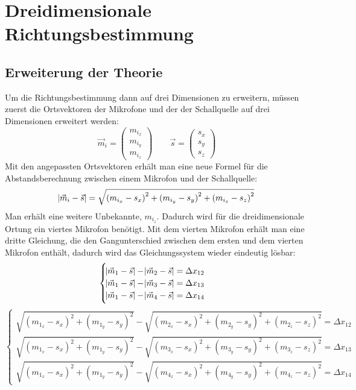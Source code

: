 \section{Dreidimensionale Richtungsbestimmung}
\subsection{Erweiterung der Theorie}
Um die Richtungsbestimmung dann auf drei Dimensionen zu erweitern, müssen zuerst die Ortsvektoren der Mikrofone und der der Schallquelle auf drei Dimensionen erweitert werden: $$\vec{m}_i = \begin{pmatrix}
m_{i_x} \\
m_{i_y} \\
m_{i_z}
\end{pmatrix} \quad\quad
\vec{s} = \begin{pmatrix}
{s_x} \\
{s_y} \\
{s_z}
\end{pmatrix}$$
Mit den angepassten Ortsvektoren erhält man eine neue Formel für die Abstandsberechnung zwischen einem Mikrofon und der Schallquelle:
$$\abs{\vec{m}_i - \vec{s}} = \sqrt{{(m_{i_x} - s_x)}^2 + {(m_{i_y} - s_y)}^2 + {(m_{i_z} - s_z)}^2}$$
Man erhält eine weitere Unbekannte, $m_{i_z}$. Dadurch wird für die dreidimensionale Ortung ein viertes Mikrofon benötigt. Mit dem vierten Mikrofon erhält man eine dritte Gleichung, die den Gangunterschied zwischen dem ersten und dem vierten Mikrofon enthält, dadurch wird das Gleichungssystem wieder eindeutig lösbar:
$$\begin{cases}
\abs{\vec{m}_1 - \vec{s}} - \abs{\vec{m}_2 - \vec{s}} = \Delta{x_{12}} \\
\abs{\vec{m}_1 - \vec{s}} - \abs{\vec{m}_3 - \vec{s}} = \Delta{x_{13}} \\
\abs{\vec{m}_1 - \vec{s}} - \abs{\vec{m}_4 - \vec{s}} = \Delta{x_{14}}
\end{cases}$$
$$\begin{cases}
\sqrt{{(m_{1_x} - s_x)}^2 + {(m_{1_y} - s_y)}^2} - \sqrt{{(m_{2_x} - s_x)}^2 + {(m_{2_y} - s_y)}^2 + {(m_{2_z} - s_z)}^2} = \Delta{x_{12}} \\
\sqrt{{(m_{1_x} - s_x)}^2 + {(m_{1_y} - s_y)}^2} - \sqrt{{(m_{3_x} - s_x)}^2 + {(m_{3_y} - s_y)}^2 + {(m_{3_z} - s_z)}^2} = \Delta{x_{13}} \\
\sqrt{{(m_{1_x} - s_x)}^2 + {(m_{1_y} - s_y)}^2} - \sqrt{{(m_{4_x} - s_x)}^2 + {(m_{4_y} - s_y)}^2 + {(m_{4_z} - s_z)}^2} = \Delta{x_{14}}
\end{cases}$$
